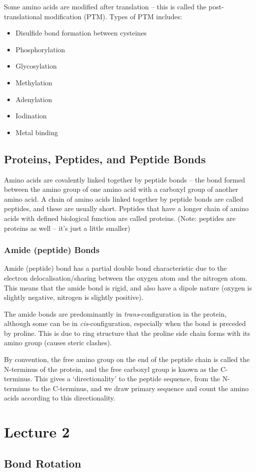 \documentclass[a4paper, 12pt]{report}
\newcommand{\mychapter}[2]{
    \setcounter{chapter}{#1}
    \setcounter{section}{0}
    \chapter*{#2}
    \addcontentsline{toc}{chapter}{#2}
}
\begin{document}
Some amino acids are modified after translation -- this is called the post-translational modification (PTM).
Types of PTM includes:
\begin{itemize}
    \item Disulfide bond formation between cysteines
    \item Phosphorylation
    \item Glycosylation
    \item Methylation
    \item Adenylation
    \item Iodination
    \item Metal binding
\end{itemize}

\section{Proteins, Peptides, and Peptide Bonds}

Amino acids are covalently linked together by peptide bonds -- the bond formed between the amino group of one amino acid with a carboxyl group of another amino acid.
A chain of amino acids linked together by peptide bonds are called peptides, and these are usually short.
Peptides that have a longer chain of amino acids with defined biological function are called proteins.
(Note: peptides are proteins as well -- it's just a little smaller)

\subsection{Amide (peptide) Bonds}

Amide (peptide) bond has a partial double bond characteristic due to the electron delocalisation/sharing between the oxygen atom and the nitrogen atom.
This means that the amide bond is rigid, and also have a dipole nature (oxygen is slightly negative, nitrogen is slightly positive).

The amide bonds are predominantly in \textit{trans}-configuration in the protein, although some can be in \textit{cis}-configuration, especially when the bond is preceded by proline.
This is due to ring structure that the proline side chain forms with its amino group (causes steric clashes).

By convention, the free amino group on the end of the peptide chain is called the N-terminus of the protein, and the free carboxyl group is known as the C-terminus.
This gives a `directionality' to the peptide sequence, from the N-terminus to the C-terminus, and we draw primary sequence and count the amino acids according to this directionality.

\mychapter{2}{Lecture 2}

\section{Bond Rotation}
\end{document}
